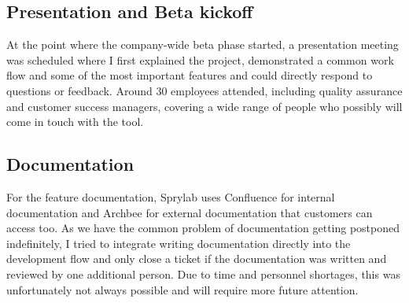 \subsection{Presentation and Beta kickoff}
At the point where the company-wide beta phase started, a presentation meeting was scheduled where I first explained the project,
demonstrated a common work flow and some of the most important features and could directly respond to questions or feedback.
Around 30 employees attended, including quality assurance and customer success managers, covering a wide range of people who possibly will come in touch with the tool.

\subsection{Documentation}
For the feature documentation, Sprylab uses Confluence for internal documentation and Archbee for external documentation that customers can access too.
As we have the common problem of documentation getting postponed indefinitely, I tried to integrate writing documentation directly into the development flow and only close a ticket if the documentation
was written and reviewed by one additional person. Due to time and personnel shortages, this was unfortunately not always possible and will require more future attention.

